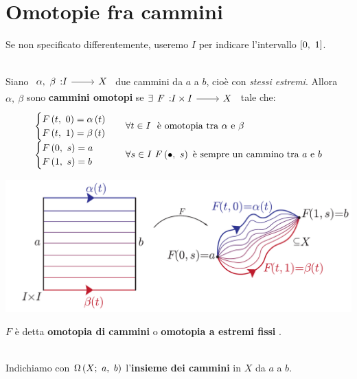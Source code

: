 \section{Omotopie fra cammini}
\begin{notate}
Se non specificato differentemente, useremo $I$ per indicare l'intervallo $\left[0,\ 1\right]$.
\vspace{-4mm}
\end{notate}
\begin{define}~{}\\
	Siano $\funz{\alpha,\ \beta}{I}{X}$ due cammini da $a$ a $b$, cioè con \textit{stessi estremi}. Allora $\alpha,\ \beta$ sono \textbf{cammini omotopi} se $\exists \funz{F}{I \times I}{X}$ tale che:
	\begin{equation}
		\begin{array}{ll}
			\begin{cases}
							F\left(t,\ 0\right)=\alpha\left(t\right)\\
				F\left(t,\ 1\right)=\beta\left(t\right)
			\end{cases}&
		\forall t\in I\ \text{ è omotopia tra } \alpha \text{ e }\beta\\
			\begin{cases}
			F\left(0,\ s\right)=a\\
			F\left(1,\ s\right)=b
		\end{cases}&
		\forall s\in I\ F\left(\bullet,\ s\right) \text{ è sempre un cammino tra } a \text{ e }b
		\end{array}
	\end{equation}
	\begin{center}
	\includegraphics[trim=0cm 0cm 0cm 0cm,clip,scale=0.4]{images/pathhomotopy.pdf}
\end{center}
$F$ è detta \textbf{omotopia di cammini} o \textbf{omotopia a estremi fissi} .
\end{define}
\begin{define}~{}\\
	Indichiamo con $\Omega\left(X;\ a,\ b\right)$ l'\textbf{insieme dei cammini} in $X$ da $a$ a $b$.
\end{define}
